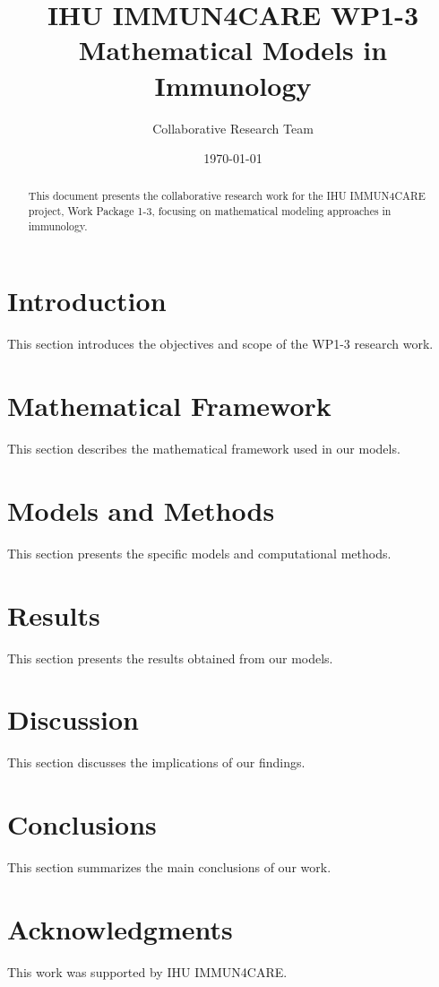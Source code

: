 \documentclass[11pt,a4paper]{article}
\title{IHU IMMUN4CARE WP1-3\\
Mathematical Models in Immunology}
\author{Collaborative Research Team}
\date{\today}
\theoremstyle{definition}
\theoremstyle{remark}
\begin{document}
\maketitle

\begin{abstract}
This document presents the collaborative research work for the IHU IMMUN4CARE project, Work Package 1-3, focusing on mathematical modeling approaches in immunology.
\end{abstract}

\tableofcontents
\newpage

\section{Introduction}
\label{sec:introduction}

This section introduces the objectives and scope of the WP1-3 research work.


\section{Mathematical Framework}
\label{sec:framework}

This section describes the mathematical framework used in our models.


\section{Models and Methods}
\label{sec:methods}

This section presents the specific models and computational methods.


\section{Results}
\label{sec:results}

This section presents the results obtained from our models.


\section{Discussion}
\label{sec:discussion}

This section discusses the implications of our findings.


\section{Conclusions}
\label{sec:conclusions}

This section summarizes the main conclusions of our work.


\section*{Acknowledgments}

This work was supported by IHU IMMUN4CARE.



\end{document}
